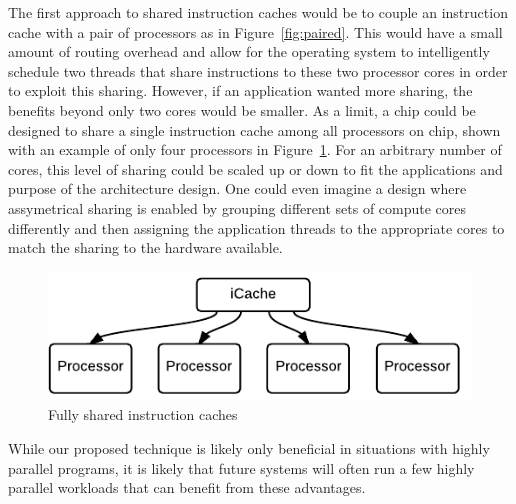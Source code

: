 The first approach to shared instruction caches would be to couple an
instruction cache with a pair of processors as in
Figure~\ref{fig:paired}. 
This would have a small amount of routing overhead and allow for the
operating system to intelligently schedule two threads that share
instructions to these two processor cores in order to exploit this
sharing. 
However, if an application wanted more sharing, the benefits beyond
only two cores would be smaller.
As a limit, a chip could be designed to share a single instruction
cache among all processors on chip, shown with an example of only four
processors in Figure~\ref{fig:shared}.
For an arbitrary number of cores, this level of sharing could be
scaled up or down to fit the applications and purpose of the
architecture design.
One could even imagine a design where assymetrical sharing is enabled
by grouping different sets of compute cores differently and then
assigning the application threads to the appropriate cores to match
the sharing to the hardware available.

\begin{figure}[ht!]
\centering
\includegraphics[width=\columnwidth]{graphics/SharedCaches}
\caption{Fully shared instruction caches}
\label{fig:shared}
\end{figure}

While our proposed technique is likely only beneficial in situations
with highly parallel programs, it is likely that future systems will
often run a few highly parallel workloads that can benefit from these
advantages. 


 




